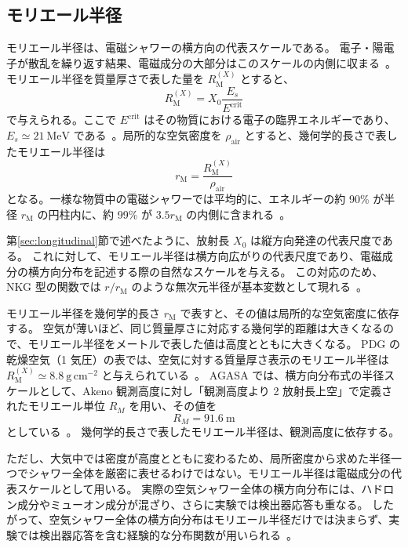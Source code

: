 \documentclass[book,paper=a4,fontsize=11pt]{jlreq}
\begin{document}
\subsection{モリエール半径}\label{subsec:moliere_radius}
モリエール半径は、電磁シャワーの横方向の代表スケールである。
電子・陽電子が散乱を繰り返す結果、電磁成分の大部分はこのスケールの内側に収まる~\cite{PDGPassage}。
モリエール半径を質量厚さで表した量を \(R_{\mathrm{M}}^{(X)}\) とすると、
\begin{equation}
  R_{\mathrm{M}}^{(X)} = X_0 \frac{E_s}{E^\mathrm{crit}}
\end{equation}
で与えられる。ここで \(E^\mathrm{crit}\) はその物質における電子の臨界エネルギーであり、\(E_s \simeq 21\ \mathrm{MeV}\) である~\cite{PDGPassage}。局所的な空気密度を \(\rho_{\mathrm{air}}\) とすると、幾何学的長さで表したモリエール半径は
\begin{equation}
  r_{\mathrm{M}}=\frac{R_{\mathrm{M}}^{(X)}}{\rho_{\mathrm{air}}}
\end{equation}
となる。一様な物質中の電磁シャワーでは平均的に、エネルギーの約 90\% が半径 \(r_{\mathrm{M}}\) の円柱内に、約 99\% が \(3.5r_{\mathrm{M}}\) の内側に含まれる~\cite{PDGPassage}。

第\ref{sec:longitudinal}節で述べたように、放射長 \(X_0\) は縦方向発達の代表尺度である。
これに対して、モリエール半径は横方向広がりの代表尺度であり、電磁成分の横方向分布を記述する際の自然なスケールを与える。
この対応のため、NKG 型の関数では \(r/r_{\mathrm{M}}\) のような無次元半径が基本変数として現れる~\cite{KamataNishimura1958,Greisen1960}。

モリエール半径を幾何学的長さ \(r_{\mathrm{M}}\) で表すと、その値は局所的な空気密度に依存する。
空気が薄いほど、同じ質量厚さに対応する幾何学的距離は大きくなるので、モリエール半径をメートルで表した値は高度とともに大きくなる。
PDG の乾燥空気（1 気圧）の表では、空気に対する質量厚さ表示のモリエール半径は \(R_{\mathrm{M}}^{(X)} \simeq 8.8\ \mathrm{g\,cm^{-2}}\) と与えられている~\cite{PDGAir}。
AGASA では、横方向分布式の半径スケールとして、Akeno 観測高度に対し「観測高度より 2 放射長上空」で定義されたモリエール単位 \(R_M\) を用い、その値を
\begin{equation}
  R_M = 91.6\ \mathrm{m}
\end{equation}
としている~\cite{Yoshida1994,Takeda2003}。
幾何学的長さで表したモリエール半径は、観測高度に依存する。

ただし、大気中では密度が高度とともに変わるため、局所密度から求めた半径一つでシャワー全体を厳密に表せるわけではない。モリエール半径は電磁成分の代表スケールとして用いる。
実際の空気シャワー全体の横方向分布には、ハドロン成分やミューオン成分が混ざり、さらに実験では検出器応答も重なる。
したがって、空気シャワー全体の横方向分布はモリエール半径だけでは決まらず、実験では検出器応答を含む経験的な分布関数が用いられる~\cite{Yoshida1994,Takeda2003}。
\end{document}
